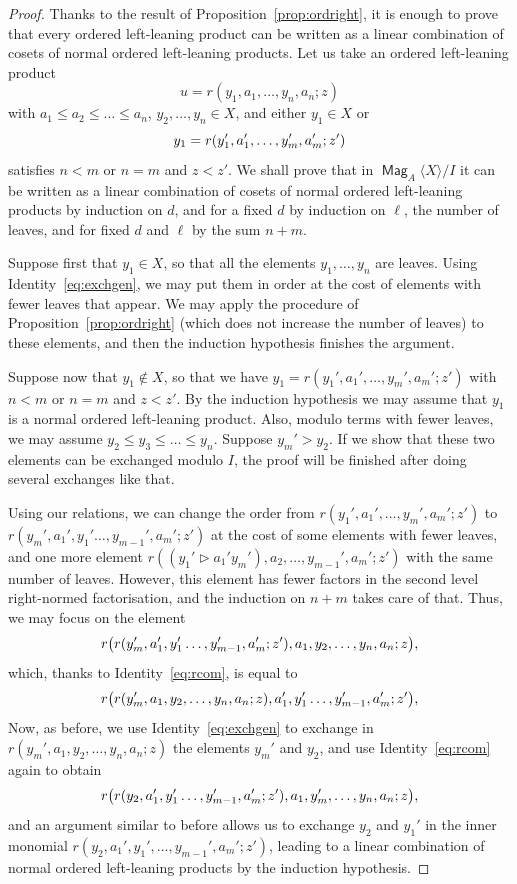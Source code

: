 \documentclass[AHL,Unicode,longabstracts]{cedram}
\DeclareMathOperator{\Mag}{\mathsf{Mag}}
\let\originalleft\left
\let\originalright\right
\renewcommand{\left}{\mathopen{}\mathclose\bgroup\originalleft}
\renewcommand{\right}{\aftergroup\egroup\originalright}
\begin{document}
\begin{proof}
Thanks to the result of Proposition~\ref{prop:ordright}, it is enough to prove that every ordered left-leaning product can be written as a linear combination of cosets of normal ordered left-leaning products. Let us take an ordered left-leaning product
\[
u=r(y_1,a_1,\dots,y_n,a_n;z)
\]
with $a_1\le a_2\le\dots\le a_n$, $y_2,\dots,y_n\in X$, and either $y_{1}\in X$ or
\[
y_{1}=
r\left(y_1',a_1',\dots,y_m',a_m';z'\right)
\]
satisfies $n<m$ or $n=m$ and $z<z'$. We shall prove that in $\Mag_A\langle X\rangle/I$ it can be written as a linear combination of cosets of normal ordered left-leaning products by induction on $d$, and for a fixed $d$ by induction on $\ell$, the number of leaves, and for fixed $d$ and $\ell$ by the sum $n+m$.

Suppose first that $y_{1}\in X$, so that all the elements $y_1,\dots,y_{n}$ are leaves. Using Identity~\eqref{eq:exchgen}, we may put them in order at the cost of elements with fewer leaves that appear. We may apply the procedure of Proposition~\ref{prop:ordright} (which does not increase the number of leaves) to these elements, and then the induction hypothesis finishes the argument.

Suppose now that $y_1\notin X$, so that we have $y_{1}=r(y_1',a_1',\dots,y_m',a_m';z')$ with $n<m$ or $n=m$ and $z<z'$. By the induction hypothesis we may assume that $y_{1}$ is a normal ordered left-leaning product. Also, modulo terms with fewer leaves, we may assume $y_2\le y_3\le\dots\le y_n$. Suppose $y_m'> y_2$. If we show that these two elements can be exchanged modulo $I$, the proof will be finished after doing several exchanges like that.

Using our relations, we can change the order from $r(y_1',a_1',\dots,y_m',a_m';z')$ to $r(y_m',a_1',y_1'\dots,y_{m-1}',a_m';z')$ at the cost of some elements with fewer leaves, and one more element $r((y_1'\triangleright a_1' y_m'),a_2,\dots,y_{m-1}',a_m';z')$ with the same number of leaves. However, this element has fewer factors in the second level right-normed factorisation, and the induction on $n+m$ takes care of that. Thus, we may focus on the element
\[
r\left(r(y_m',a_1',y_1'\dots,y_{m-1}',a_m';z'),a_1,y_2,\dots,y_n,a_n;z\right),
\]
which, thanks to Identity~\eqref{eq:rcom}, is equal to
\[
r\left(r(y_m',a_1,y_2,\dots,y_n,a_n;z),a_1',y_1'\dots,y_{m-1}',a_m';z'
\right),
\]
Now, as before, we use Identity~\eqref{eq:exchgen} to exchange in $r(y_m',a_1,y_2,\dots,y_n,a_n;z)$ the elements $y_m'$ and $y_2$, and use Identity~\eqref{eq:rcom} again to obtain
\[
r\left(r(y_2,a_1',y_1'\dots,y_{m-1}',a_m';z'),a_1,y_m',\dots,y_n,a_n;z
\right),
\]
and an argument similar to before allows us to exchange $y_2$ and $y_{1}'$ in the inner monomial $r(y_2,a_1',y_1',\dots,y_{m-1}',a_m';z')$, leading to a linear combination of normal ordered left-leaning products by the induction hypothesis.
\end{proof}
\end{document}
